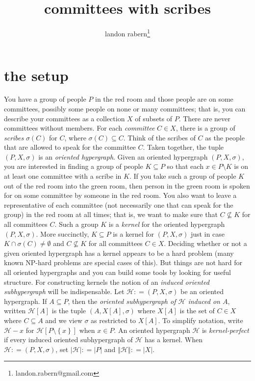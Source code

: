 \documentclass[12pt]{article}
\title{committees with scribes}
\author{landon rabern\thanks{landon.rabern@gmail.com}}
\newcommand{\fancy}[1]{\mathcal{#1}}
\newcommand{\HH}{\fancy{H}}
\newcommand{\set}[1]{\left\{ #1 \right\}}
\newcommand{\card}[1]{\left|#1\right|}
\newcommand{\size}[1]{\left\Vert#1\right\Vert}
\newcommand{\brackets}[1]{\left[ #1 \right]}
\newcommand{\DefinedAs}{\mathrel{\mathop:}=}
\def\s{\sigma}
\begin{document}
\maketitle

\section*{the setup}
You have a group of people $P$ in the red room and those people are on some committees, possibly some people on none or many committees; that is, you can describe your
committees as a collection $X$ of subsets of $P$.  There are never committees without members. For each \emph{committee} $C \in X$, there is a group of \emph{scribes} $\s(C)$ for $C$,  where $\s(C) \subseteq C$.
Think of the scribes of $C$ as the people that are allowed to speak for the committee $C$.
Taken together, the tuple $(P,X,\sigma)$ is an \emph{oriented hypergraph}.  Given an oriented hypergraph $(P,X,\sigma)$, you are interested in finding a
group of people $K \subseteq P$ so that each $x \in P \setminus K$ is on at least one committee with a scribe in $K$.  
If you take such a group of people $K$ out of the red room into the green room,
then person in the green room is spoken for on some committee by someone in the red room. 
You also want to leave a representative of each committee (not necessarily one that can speak for the group) in the red room
at all times; that is, we want to make sure that $C \not \subseteq K$ for all committees $C$.  Such a group $K$ is a \emph{kernel} for the oriented hypergraph $(P,X,\sigma)$.  
More succinctly, $K \subseteq P$ is a kernel for $(P,X,\sigma)$ just in case $K \cap \sigma(C) \ne \emptyset$ and $C \not \subseteq K$ for all committees $C \in X$.  Deciding
whether or not a given oriented hypergraph has a kernel appears to be a hard problem (many known NP-hard problems are special cases of this).  But things are not hard for
all oriented hypergraphs and you can build some tools by looking for useful structure.  For constructing kernels the notion of an \emph{induced oriented subhypergraph} will be indispensable.
Let $\HH \DefinedAs (P,X,\sigma)$ be an oriented hypergraph.  If $A \subseteq P$, then the \emph{oriented subhypergraph of $\HH$ induced on $A$}, written $\HH[A]$ is the tuple 
$(A, X\brackets{A}, \sigma)$ where $X\brackets{A}$ is the set of $C \in X$ where $C \subseteq A$ and we view $\sigma$ as restricted to $X\brackets{A}$.  To simplify notation, write 
$\HH-x$ for $\HH\brackets{P\setminus\set{x}}$ when $x \in P$. 
An oriented hypergraph $\HH$ is \emph{kernel-perfect} if every induced oriented subhypergraph of $\HH$ has a kernel.  When $\HH \DefinedAs (P,X,\sigma)$, set $\card{\HH} \DefinedAs \card{P}$
and $\size{\HH} \DefinedAs \card{X}$.
\end{document}
